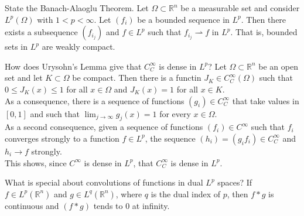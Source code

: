\documentclass[avery5388,grid,frame]{flashcards}
\def\Rl{\mathbb{R}}
\begin{document}
\begin{flashcard}
    {State the Banach-Alaoglu Theorem.}
    Let $\Omega \subset \Rl^n$ be a measurable set and consider $L^p(\Omega)$ with $1 < p < \infty$.  Let $(f_i)$ be a bounded sequence in $L^p$.  Then there exists a subsequence $(f_{i_j})$ and $f \in L^p$ such that $f_{i_j} \rightharpoonup f$ in $L^p$.  That is, bounded sets in $L^p$ are weakly compact.
\end{flashcard}

\begin{flashcard}
    {How does Urysohn's Lemma give that $C_C^\infty$ is dense in $L^p$?}
    Let $\Omega \subset \Rl^n$ be an open set and let $K \subset \Omega$ be compact.  Then there is a functin $J_K \in C_C^\infty(\Omega)$ such that $0 \leq J_K(x) \leq 1$ for all $x \in \Omega$ and $J_K(x) = 1$ for all $x \in K$. \\

    As a consequence, there is a sequence of functions $(g_i) \in C_C^\infty$ that take values in $[0,1]$ and such that $\displaystyle\lim_{j\rightarrow\infty}g_j(x) = 1$ for every $x \in \Omega$. \\

    As a second consequence, given a sequence of functions $(f_i) \in C^\infty$ such that $f_i$ converges strongly to a function $f \in L^p$, the sequence $(h_i) = (g_if_i) \in C_C^\infty$ and $h_i \rightarrow f$ strongly. \\

    This shows, since $C^\infty$ is dense in $L^p$, that $C_C^\infty$ is dense in $L^p$.
\end{flashcard}

\begin{flashcard}
    {What is special about convolutions of functions in dual $L^p$ spaces?}
    If $f \in L^p(\Rl^n)$ and $g \in L^q(\Rl^n)$, where $q$ is the dual index of $p$, then $f*g$ is continuous and $(f*g)$ tends to $0$ at infinity.
\end{flashcard}
\end{document}
